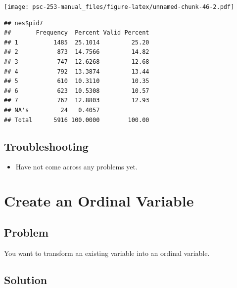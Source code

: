 \documentclass[
]{book}
\newenvironment{Shaded}{\begin{snugshade}}{\end{snugshade}}
\newcommand{\CommentTok}[1]{\textcolor[rgb]{0.56,0.35,0.01}{\textit{#1}}}
\newcommand{\FunctionTok}[1]{\textcolor[rgb]{0.00,0.00,0.00}{#1}}
\newcommand{\NormalTok}[1]{#1}
\newcommand{\OtherTok}[1]{\textcolor[rgb]{0.56,0.35,0.01}{#1}}
\newcommand{\SpecialCharTok}[1]{\textcolor[rgb]{0.00,0.00,0.00}{#1}}
\providecommand{\tightlist}{%
  \setlength{\itemsep}{0pt}\setlength{\parskip}{0pt}}
\begin{document}
\begin{Shaded}
\end{Shaded}

\texttt{[image: psc-253-manual\_files/figure-latex/unnamed-chunk-46-2.pdf]}

\begin{verbatim}
## nes$pid7 
##       Frequency  Percent Valid Percent
## 1          1485  25.1014         25.20
## 2           873  14.7566         14.82
## 3           747  12.6268         12.68
## 4           792  13.3874         13.44
## 5           610  10.3110         10.35
## 6           623  10.5308         10.57
## 7           762  12.8803         12.93
## NA's         24   0.4057              
## Total      5916 100.0000        100.00
\end{verbatim}

\hypertarget{troubleshooting-15}{%
\subsection{Troubleshooting}\label{troubleshooting-15}}

\begin{itemize}
\tightlist
\item
  Have not come across any problems yet.
\end{itemize}

\hypertarget{ordinal}{%
\section{Create an Ordinal Variable}\label{ordinal}}

\hypertarget{problem-19}{%
\subsection{Problem}\label{problem-19}}

You want to transform an existing variable into an ordinal variable.

\hypertarget{solution-19}{%
\subsection{Solution}\label{solution-19}}
\end{document}
